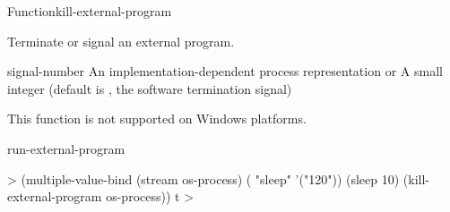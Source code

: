 \documentclass[10pt,twoside,english,pdftex]{article}
\begin{document}
\begin{functiondoc}{Function}{kill-external-program}{
  }
%
%
%
%

\fnsyntax

\fnpurpose Terminate or signal an external program.

\fnpackage {}

\fnmodule {}

\fnargs
\begin{args}{signal-number}
\arg[os-process] An implementation-dependent process representation or \nil{}
 A small integer (default is , the software
termination signal)
\end{args}
  
\fnerrors
This function is not supported on Windows platforms.

\begin{alsos}{run-external-program}
\end{alsos}

%
\fnexample
%
\W\supp
\begin{example}
  > (multiple-value-bind (stream os-process)
         ( "sleep" '("120"))
       (sleep 10)
       (kill-external-program os-process))
  t
  >
\end{example}

\end{functiondoc}

\end{document}
